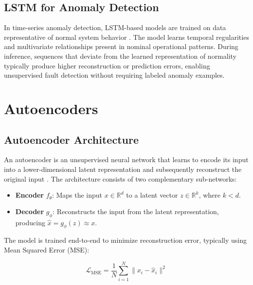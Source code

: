\subsection{LSTM for Anomaly Detection}
\label{subsec:lstm_anomaly}

In time-series anomaly detection, LSTM-based models are trained on data representative
of normal system behavior \cite{malhotra2015lstm, hundman2018detecting,
ergen2017unsupervised}. The model learns temporal regularities and multivariate
relationships present in nominal operational patterns. During inference, sequences that
deviate from the learned representation of normality typically produce higher
reconstruction or prediction errors, enabling unsupervised fault detection without
requiring labeled anomaly examples.

\section{Autoencoders}
\label{sec:autoencoders}

\subsection{Autoencoder Architecture}
\label{subsec:ae_architecture}

An autoencoder is an unsupervised neural network that learns to encode its input into a
lower-dimensional latent representation and subsequently reconstruct the original input
\cite{hinton2006reducing, goodfellow2016deep}. The architecture consists of two
complementary sub-networks:

\begin{itemize}
    \item \textbf{Encoder} $f_\theta$: Maps the input $x \in \mathbb{R}^d$ to a
    latent vector $z \in \mathbb{R}^k$, where $k < d$.

    \item \textbf{Decoder} $g_\phi$: Reconstructs the input from the latent
    representation, producing $\hat{x} = g_\phi(z) \approx x$.
\end{itemize}

The model is trained end-to-end to minimize reconstruction error, typically using Mean
Squared Error (MSE):

\begin{equation}
    \mathcal{L}_{\text{MSE}} = \frac{1}{N} \sum_{i=1}^{N} \|x_i - \hat{x}_i\|^2
    \label{eq:mse_loss}
\end{equation}

